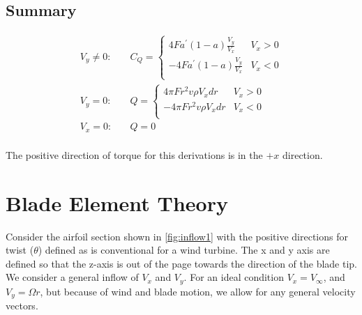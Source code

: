 \subsection{Summary}



\begin{equation}
\begin{aligned}
    V_y \ne 0:&\quad
    C_Q = \begin{cases}
        4 F a^\prime (1-a) \frac{V_y}{V_x} &  V_x > 0 \\
        - 4 F a^\prime (1-a) \frac{V_y}{V_x} &  V_x < 0 \\
    \end{cases}\\
    V_y = 0:&\quad
    Q = \begin{cases}
        4 \pi F r^2 v \rho V_x dr &  V_x > 0 \\
        -4 \pi F r^2 v \rho V_x dr &  V_x < 0 \\
    \end{cases}\\
    V_x = 0:&\quad Q = 0\\
\end{aligned}
\label{eq:CQmom}
\end{equation}

The positive direction of torque for this derivations is in the $+x$ direction.

\section{Blade Element Theory}
\label{sec:be}

Consider the airfoil section shown in \cref{fig:inflow1} with the positive directions for twist ($\theta$) defined as is conventional for a wind turbine.  The x and y axis are defined so that the z-axis is out of the page towards the direction of the blade tip.  We consider a general inflow of $V_x$ and $V_y$.  For an ideal condition $V_x = V_\infty$, and $V_y = \Omega r$, but because of wind and blade motion, we allow for any general velocity vectors.

